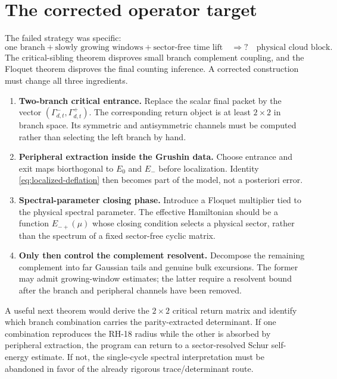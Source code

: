 \documentclass[11pt]{article}
\theoremstyle{definition}
\theoremstyle{remark}
\begin{document}
\section{The corrected operator target}
\label{sec:corrected-route}

The failed strategy was specific:
\begin{equation}\label{eq:failed-strategy}
 \text{one branch}
 +\text{slowly growing windows}
 +\text{sector-free time lift}
 \quad\Longrightarrow?\quad
 \text{physical cloud block}.
\end{equation}
The critical-sibling theorem disproves small branch complement coupling, and
the Floquet theorem disproves the final counting inference.  A corrected
construction must change all three ingredients.

\begin{enumerate}[label=\textbf{R\arabic*.},leftmargin=3.1em]
 \item \textbf{Two-branch critical entrance.}
 Replace the scalar final packet by the vector
 $(\Gamma^-_{d,t},\Gamma^+_{d,t})$.  The corresponding return object is at
 least $2\times2$ in branch space.  Its symmetric and antisymmetric channels
 must be computed rather than selecting the left branch by hand.

 \item \textbf{Peripheral extraction inside the Grushin data.}
 Choose entrance and exit maps biorthogonal to $E_0$ and $E_-$ before
 localization.  Identity \eqref{eq:localized-deflation} then becomes part of
 the model, not a posteriori error.

 \item \textbf{Spectral-parameter closing phase.}
 Introduce a Floquet multiplier tied to the physical spectral parameter.
 The effective Hamiltonian should be a function $E_{-+}(\mu)$ whose closing
 condition selects a physical sector, rather than the spectrum of a fixed
 sector-free cyclic matrix.

 \item \textbf{Only then control the complement resolvent.}
 Decompose the remaining complement into far Gaussian tails and genuine bulk
 excursions.  The former may admit growing-window estimates; the latter
 require a resolvent bound after the branch and peripheral channels have been
 removed.
\end{enumerate}

A useful next theorem would derive the $2\times2$ critical return matrix and
identify which branch combination carries the parity-extracted determinant.
If one combination reproduces the RH-18 radius while the other is absorbed
by peripheral extraction, the program can return to a sector-resolved Schur
self-energy estimate.  If not, the single-cycle spectral interpretation must
be abandoned in favor of the already rigorous trace/determinant route.
\end{document}
